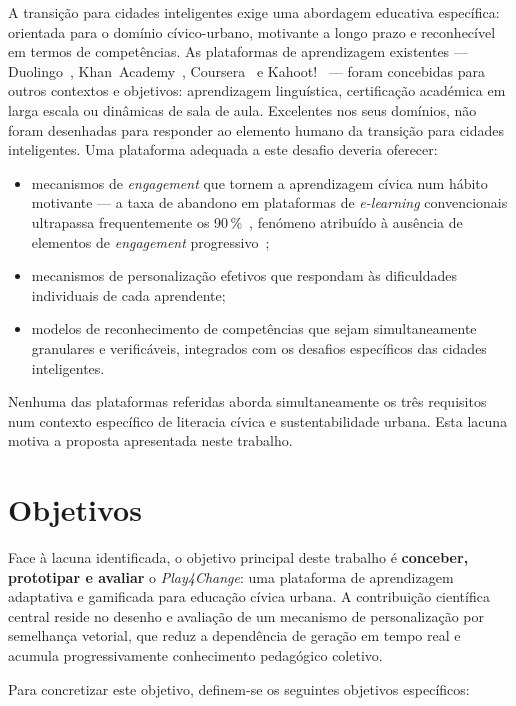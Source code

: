 A transição para cidades inteligentes exige uma abordagem educativa específica:
orientada para o domínio cívico-urbano, motivante a longo prazo e reconhecível em
termos de competências. As plataformas de aprendizagem existentes ---
Duolingo~\cite{duolingo2024}, Khan~Academy~\cite{khanacademy2024},
Coursera~\cite{coursera2024} e Kahoot!~\cite{kahoot2024} --- foram concebidas para
outros contextos e objetivos: aprendizagem linguística, certificação académica em
larga escala ou dinâmicas de sala de aula. Excelentes nos seus domínios, não foram
desenhadas para responder ao elemento humano da transição para cidades inteligentes.
Uma plataforma adequada a este desafio deveria oferecer:
\begin{itemize}
  \item mecanismos de \textit{engagement} que tornem a aprendizagem cívica num hábito
        motivante --- a taxa de abandono em plataformas de \textit{e-learning}
        convencionais ultrapassa frequentemente os 90\,\%~\cite{jordan2015mooc}, fenómeno
        atribuído à ausência de elementos de \textit{engagement} progressivo~\cite{hamari2014does};
  \item mecanismos de personalização efetivos que respondam às dificuldades individuais
        de cada aprendente;
  \item modelos de reconhecimento de competências que sejam simultaneamente granulares
        e verificáveis, integrados com os desafios específicos das cidades inteligentes.
\end{itemize}

Nenhuma das plataformas referidas aborda simultaneamente os três requisitos num
contexto específico de literacia cívica e sustentabilidade urbana. Esta lacuna motiva
a proposta apresentada neste trabalho.

\section{Objetivos}
\label{sec:objetivos}

Face à lacuna identificada, o objetivo principal deste trabalho é
\textbf{conceber, prototipar e avaliar} o \textit{Play4Change}: uma plataforma de
aprendizagem adaptativa e gamificada para educação cívica urbana. A contribuição
científica central reside no desenho e avaliação de um mecanismo de personalização
por semelhança vetorial, que reduz a dependência de geração em tempo real e acumula
progressivamente conhecimento pedagógico coletivo.

Para concretizar este objetivo, definem-se os seguintes objetivos específicos:

